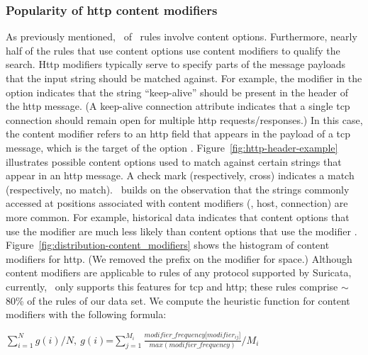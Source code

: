 \documentclass[conference]{IEEEtran}
\begin{document}
\subsubsection{\label{sec:popularity-content-modifiers}Popularity of http content modifiers} As previously
mentioned, \percRulesWithContent\ of \suri\ rules involve content
options. Furthermore, nearly half of the rules that use content
options use content modifiers to qualify the search. Http modifiers
typically serve to specify parts of the message payloads that the
input string should be matched against. For example, the modifier
 in the option  indicates that the string ``keep-alive'' should be
present in the header of the http message. (A keep-alive connection
attribute indicates that a single tcp connection should remain open
for multiple http requests/responses.) In this case, the content
modifier refers to an http field that appears in the payload of a tcp
message, which is the target of the option
. Figure~\ref{fig:http-header-example} illustrates
possible content options used to match against certain strings that
appear in an http message. A check mark (respectively, cross)
indicates a match (respectively, no match).
\tname\ builds on the observation that the strings commonly accessed
at positions associated with content modifiers (\eg{}, host,
connection) are more common. For example, historical data indicates
that content options that use the modifier  are
much less likely than content options that use the modifier
. Figure~\ref{fig:distribution-content_modifiers} shows
the histogram of content modifiers for http. (We removed the prefix
 on the modifier for space.) Although content modifiers
are applicable to rules of any protocol supported by Suricata,
currently, \tname\ only supports this features for tcp and http; these
rules comprise $\sim$80\% of the rules of our data set. We compute the
heuristic function for content modifiers with the following formula:

\indent
$\sum_{i=1}^{N}g(i)/N,~g(i)$=$\sum_{j=1}^{M_i}\frac{\mathit{modifier\_frequency[modifier_{ij}}]}{\mathit{max(modifier\_frequency)}}/M_i$
\end{document}
